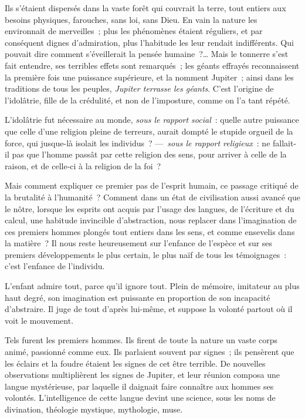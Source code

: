 \documentclass[french,twoside]{book} %
\begin{document}
Ils s’étaient dispersés dans la vaste forêt qui couvrait la terre, tout entiers aux besoins physiques,  farouches, sans loi, sans Dieu. En vain la nature les environnait de merveilles ; plus les phénomènes étaient réguliers, et par conséquent dignes d’admiration, plus l’habitude les leur rendait indifférents. Qui pouvait dire comment s’éveillerait la pensée humaine ?… Mais le tonnerre s’est fait entendre, ses terribles effets sont remarqués ; les géants effrayés reconnaissent la première fois une puissance supérieure, et la nomment Jupiter ; ainsi dans les traditions de tous les peuples, {\itshape Jupiter terrasse les géants}. C’est l’origine de l’idolâtrie, fille de la crédulité, et non de l’imposture, comme on l’a tant répété.\par
L’idolâtrie fut nécessaire au monde, {\itshape sous le rapport social} : quelle autre puissance que celle d’une religion pleine de terreurs, aurait dompté le stupide orgueil de la force, qui jusque-là isolait les individus ? — {\itshape sous le rapport religieux} : ne fallait-il pas que l’homme passât par cette religion des sens, pour arriver à celle de la raison, et de celle-ci à la religion de la foi ?\par
Mais comment expliquer ce premier pas de l’esprit humain, ce passage critiqué de la brutalité à l’humanité ? Comment dans un état de civilisation aussi avancé que le nôtre, lorsque les esprits ont acquis par l’usage des langues, de l’écriture et du calcul, une habitude invincible d’abstraction, nous replacer dans l’imagination de ces premiers hommes  plongés tout entiers dans les sens, et comme ensevelis dans la matière ? Il nous reste heureusement sur l’enfance de l’espèce et sur ses premiers développements le plus certain, le plus naïf de tous les témoignages : c’est l’enfance de l’individu.\par
L’enfant admire tout, parce qu’il ignore tout. Plein de mémoire, imitateur au plus haut degré, son imagination est puissante en proportion de son incapacité d’abstraire. Il juge de tout d’après lui-même, et suppose la volonté partout où il voit le mouvement.\par
Tels furent les premiers hommes. Ils firent de toute la nature un vaste corps animé, passionné comme eux. Ils parlaient souvent par signes ; ils pensèrent que les éclairs et la foudre étaient les signes de cet être terrible. De nouvelles observations multiplièrent les signes de Jupiter, et leur réunion composa une langue mystérieuse, par laquelle il daignait faire connaître aux hommes ses volontés. L’intelligence de cette langue devint une science, sous les noms de divination, théologie mystique, mythologie, muse.\par
\end{document}
